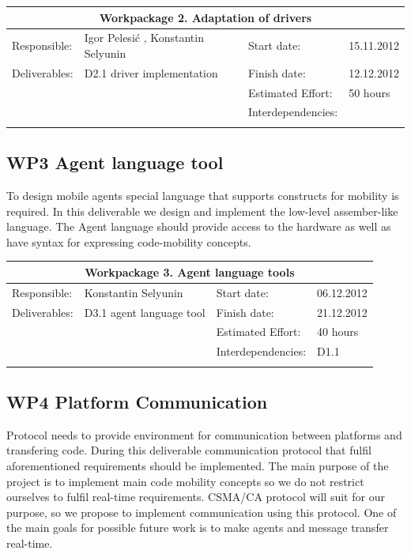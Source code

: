 \documentclass{scrreprt}
\begin{document}
\vspace{0.2in}
\begin{tabular}{|ll|ll|}
\hline \multicolumn{4}{|c|}{\textbf{Workpackage 2. Adaptation of drivers}}\\
\hline
Responsible:	&  Igor Pelesi\'c , Konstantin Selyunin	& Start date:		& 15.11.2012 \\
Deliverables:	&  D2.1 driver implementation		& Finish date:	 	& 12.12.2012\\
		&  					& Estimated Effort: 	& 50 hours \\
		&  					& Interdependencies:	& 	\\
		&  					& 			& 	\\
\hline
\end{tabular}


	\subsection{WP3 Agent language tool}

To design mobile agents special language that supports constructs for mobility is required.
In this deliverable we design and implement the low-level assember-like language.
The Agent language should provide access to the hardware as well as have syntax for expressing code-mobility concepts. 

\vspace{0.2in}
\begin{tabular}{|ll|ll|}
\hline \multicolumn{4}{|c|}{\textbf{Workpackage 3. Agent language tools }}\\
\hline
Responsible:	&  Konstantin Selyunin			& Start date:		& 06.12.2012 \\
Deliverables:	&  D3.1 agent language tool		& Finish date:	 	& 21.12.2012\\
		&  					& Estimated Effort: 	& 40 hours \\
		&  					& Interdependencies:	& D1.1 	\\
		&  					& 			& 	\\
\hline
\end{tabular}


	\subsection{WP4 Platform Communication}

Protocol needs to provide environment for communication between platforms and transfering code.
During this deliverable communication protocol that fulfil aforementioned requirements should be implemented.
The main purpose of the project is to implement main code mobility concepts
so we do not restrict ourselves to fulfil real-time requirements.
CSMA/CA protocol will suit for our purpose, so we propose to implement communication using this protocol.
One of the main goals for possible future work is to make agents and message transfer real-time.
\end{document}

